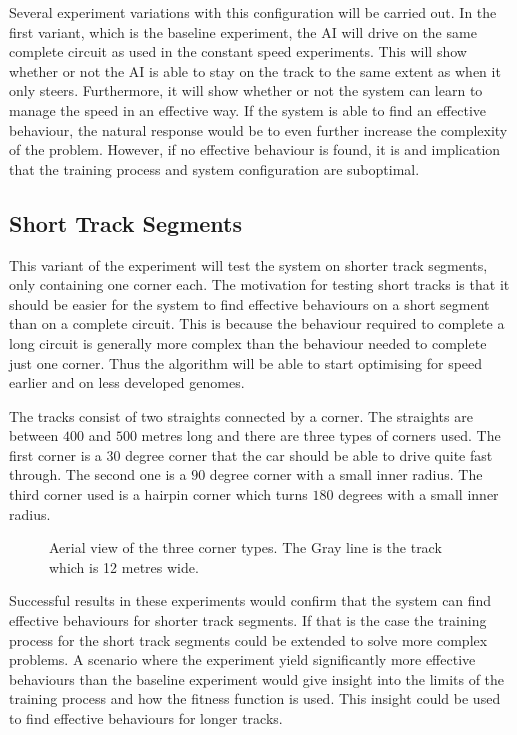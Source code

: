 Several experiment variations with this configuration will be carried out. In the first variant, which is the baseline experiment, the AI will drive on the same complete circuit as used in the constant speed experiments. This will show whether or not the AI is able to stay on the track to the same extent as when it only steers. Furthermore, it will show whether or not the system can learn to manage the speed in an effective way. If the system is able to find an effective behaviour, the natural response would be to even further increase the complexity of the problem. However, if no effective behaviour is found, it is and implication that the training process and system configuration are suboptimal. 

\subsection{Short Track Segments}
\label{subsec:shorttracksegment}
This variant of the experiment will test the system on shorter track segments, only containing one corner each. The motivation for testing short tracks is that it should be easier for the system to find effective behaviours on a short segment than on a complete circuit. This is because the behaviour required to complete a long circuit is generally more complex than the behaviour needed to complete just one corner. Thus the algorithm will be able to start optimising for speed earlier and on less developed genomes. 

The tracks consist of two straights connected by a corner. The straights are between $400$ and $500$ metres long and there are three types of corners used. The first corner is a $30$ degree corner that the car should be able to drive quite fast through. The second one is a $90$ degree corner with a small inner radius. The third corner used is a hairpin corner which turns $180$ degrees with a small inner radius. 
\begin{figure}[H]
    \centering
    \qquad
    \qquad

    \caption{Aerial view of the three corner types. The Gray line is the track which is 12 metres wide.}
\end{figure}
Successful results in these experiments would confirm that the system can find effective behaviours for shorter track segments. If that is the case the training process for the short track segments could be extended to solve more complex problems. A scenario where the experiment yield significantly more effective behaviours than the baseline experiment would give insight into the limits of the training process and how the fitness function is used. This insight could be used to find effective behaviours for longer tracks. 

